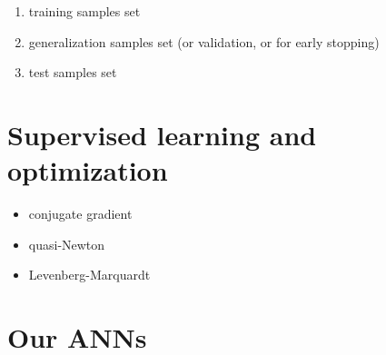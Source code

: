 \begin{enumerate}
  \item{training samples set}
  \item{generalization samples set (or validation, or for early stopping)}
  \item{test samples set}
\end{enumerate}

\section{Supervised learning and optimization}
\label{sec:supervisedlearningandoptimization}

\begin{itemize}
  \item{conjugate gradient }
  \item{quasi-Newton}
  \item{Levenberg-Marquardt}
\end{itemize}

\section{Our ANNs}
\label{sec:ouranns}


